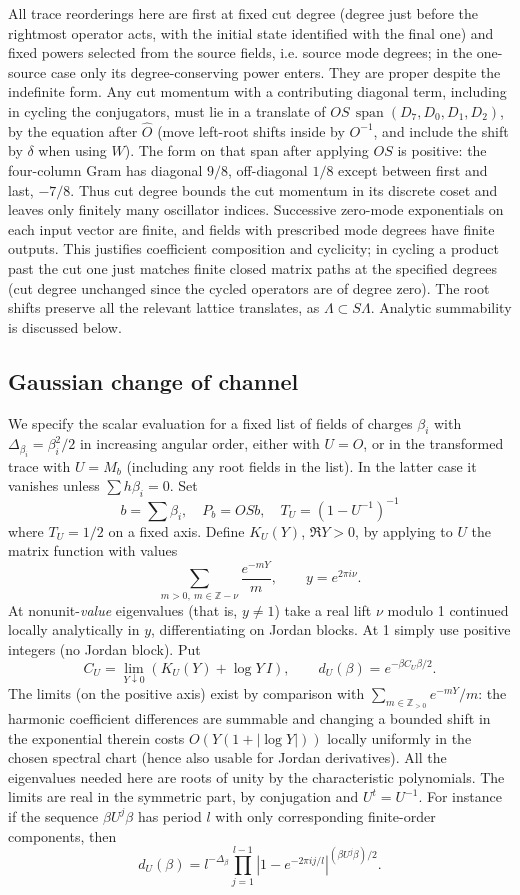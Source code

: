 All trace reorderings here are first at fixed cut degree (degree just before the rightmost operator acts, with the initial state identified with the final one) and fixed powers selected from the source fields, i.e. source mode degrees; in the one-source case only its degree-conserving power enters. They are proper despite the indefinite form. Any cut momentum with a contributing diagonal term, including in cycling the conjugators, must lie in a translate of \(OS\,\operatorname{span}(D_7,D_0,D_1,D_2)\), by the equation after \(\widehat O\) (move left-root shifts inside by \(O^{-1}\), and include the shift by \(\delta\) when using \(W\)). The form on that span after applying \(OS\) is positive: the four-column Gram has diagonal \(9/8\), off-diagonal \(1/8\) except between first and last, \(-7/8\). Thus cut degree bounds the cut momentum in its discrete coset and leaves only finitely many oscillator indices. Successive zero-mode exponentials on each input vector are finite, and fields with prescribed mode degrees have finite outputs. This justifies coefficient composition and cyclicity; in cycling a product past the cut one just matches finite closed matrix paths at the specified degrees (cut degree unchanged since the cycled operators are of degree zero). The root shifts preserve all the relevant lattice translates, as \(\Lambda\subset S\Lambda\). Analytic summability is discussed below.

\subsection{Gaussian change of channel}\label{L:step4}

We specify the scalar evaluation for a fixed list of fields of charges \(\beta_i\) with \(\Delta_{\beta_i}=\beta_i^2/2\) in increasing angular order, either with \(U=O\), or in the transformed trace with \(U=M_b\) (including any root fields in the list). In the latter case it vanishes unless
\(\sum h\beta_i=0\). Set
\[
 b=\sum\beta_i,\quad P_b=OS b,\quad T_U=(1-U^{-1})^{-1}
\]
where \(T_U=1/2\) on a fixed axis. Define \(K_U(Y)\), \(\Re Y>0\), by applying to \(U\) the matrix function with values
\[
 \sum_{m>0,\ m\in\mathbb Z-\nu}\frac{e^{-mY}}m ,
 \qquad y=e^{2\pi i\nu}.
\]
At nonunit-\emph{value} eigenvalues (that is, \(y\ne1\)) take a real lift \(\nu\) modulo 1 continued locally analytically in \(y\), differentiating on Jordan blocks. At 1 simply use positive integers (no Jordan block). Put
\[
 C_U=\lim_{Y\downarrow0}(K_U(Y)+\log Y\,I),\qquad
 d_U(\beta)=e^{-\beta C_U\beta/2}.
\]
The limits (on the positive axis) exist by comparison with \(\sum_{m\in\mathbb Z_{>0}}e^{-mY}/m\): the harmonic coefficient differences are summable and changing a bounded shift in the exponential therein costs \(O(Y(1+|\log Y|))\) locally uniformly in the chosen spectral chart (hence also usable for Jordan derivatives). All the eigenvalues needed here are roots of unity by the characteristic polynomials. The limits are real in the symmetric part, by conjugation and \(U^t=U^{-1}\). For instance if the sequence \(\beta U^j\beta\) has period \(l\) with only corresponding finite-order components, then
\[
 d_U(\beta)=l^{-\Delta_\beta}\prod_{j=1}^{l-1}|1-e^{-2\pi i j/l}|^{(\beta U^j\beta)/2}.
\]

